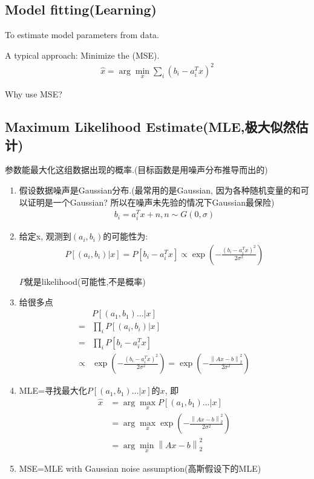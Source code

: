 \subsection{Model fitting(Learning)}
To estimate model parameters from data.

A typical approach: Minimize the (MSE).
\begin{align*}
    \hat{x}=\arg \min_x\sum_i(b_i-a_i^Tx)^2
\end{align*}

Why use MSE?
\subsection{Maximum Likelihood Estimate(MLE,极大似然估计)}
参数能最大化这组数据出现的概率.(目标函数是用噪声分布推导而出的)
\begin{enumerate}
    \item 假设数据噪声是Gaussian分布.(最常用的是Gaussian, 因为各种随机变量的和可以证明是一个Gaussian? 所以在噪声未先验的情况下Gaussian最保险)
    \begin{align*}
        b_i=a_i^Tx+n, n\sim G(0,\sigma)
    \end{align*}
    \item 给定x, 观测到$(a_i,b_i)$的可能性为:
    \begin{align*}
        P[(a_i,b_i)|x]=P[b_i-a_i^Tx]\varpropto \exp(-\frac{(b_i-a_i^Tx)^2}{2\sigma^2})
    \end{align*}
    
    $P$就是likelihood(可能性,不是概率)

    \item 给很多点
    \begin{align*}
        &P[(a_1,b_1)\dots|x]\\
        =&\prod_i P[(a_i,b_i)|x]\\
        =&\prod_i P[b_i-a_i^Tx]\\
        \varpropto& \exp(-\frac{(b_i-a_i^Tx)^2}{2\sigma^2})=\exp(-\frac{\left\| Ax-b \right\|_2^2}{2\sigma^2})
    \end{align*}

    \item MLE=寻找最大化$P[(a_1,b_1)\dots|x]$的$x$, 即
    \begin{align*}
        \hat{x}&=\arg \max_x P[(a_1,b_1)\dots|x]\\
        &=\arg \max_x \exp(-\frac{\left\| Ax-b \right\|_2^2}{2\sigma^2})\\
        &=\arg \min_x \left\| Ax-b \right\|_2^2
    \end{align*}
    \item MSE=MLE with Gaussian noise assumption(高斯假设下的MLE)
\end{enumerate}

